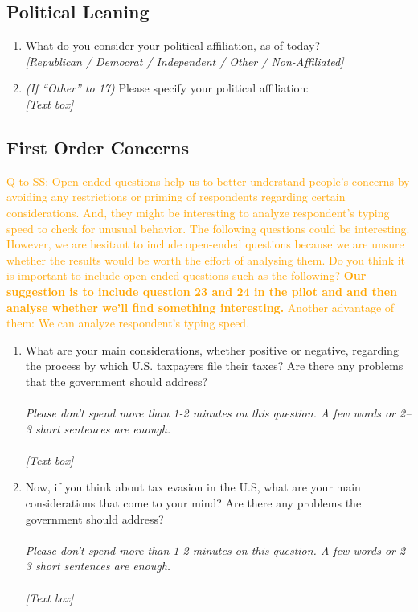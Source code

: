 \documentclass[11pt]{article}
\newcommand{\tk}[1]{\textcolor{orange}{#1}}
\begin{document}
\subsection*{Political Leaning}
\begin{enumerate}[resume]
    \item What do you consider your political affiliation, as of today?\\
    \textit{[Republican / Democrat / Independent / Other / Non-Affiliated]} 
    \item \label{n:19} \textit{(If “Other” to 17)} Please specify your political affiliation: \\ \textit{[Text box]}
\end{enumerate}

\subsection*{First Order Concerns}
\tk{Q to SS: Open-ended questions help us to better understand people's concerns by avoiding any restrictions or priming of respondents regarding certain considerations. And, they might be interesting to analyze respondent's typing speed to check for unusual behavior. The following questions could be interesting. However, we are hesitant to include open-ended questions because we are unsure whether the results would be worth the effort of analysing them. Do you think it is important to include open-ended questions such as the following? \textbf{Our suggestion is to include question 23 and 24 in the pilot and and then analyse whether we'll find something interesting.} Another advantage of them: We can analyze respondent's typing speed.}
\begin{enumerate}[resume]
    \item What are your main considerations, whether positive or negative, regarding the process by which U.S. taxpayers file their taxes? Are there any problems that the government should address? \\ \\ \noindent \textit{Please don't spend more than 1-2 minutes on this question. A few words or 2–3 short sentences are enough.} \\ \\ \textit{[Text box]}
    \item Now, if you think about tax evasion in the U.S, what are your main considerations that come to your mind? Are there any problems the government should address?\\ \\ \noindent \textit{Please don't spend more than 1-2 minutes on this question. A few words or 2–3 short sentences are enough.} \\ \\ \textit{[Text box]}
\end{enumerate}
\end{document}
